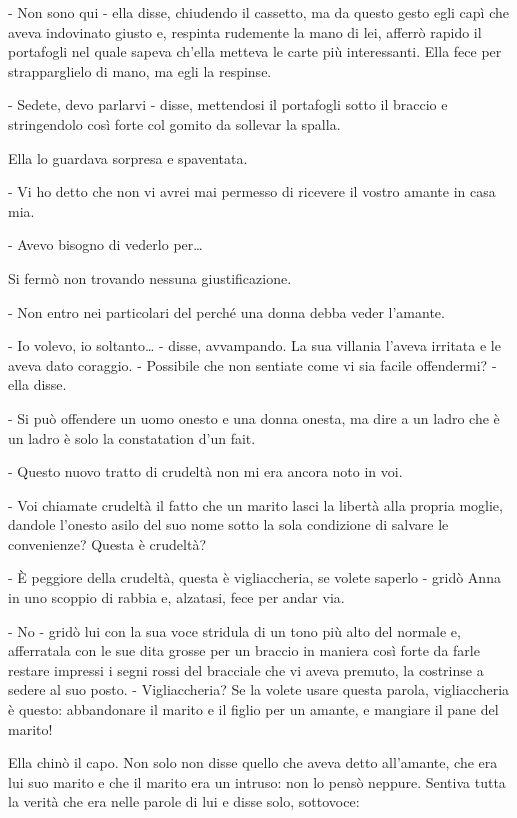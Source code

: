 - Non sono qui - ella disse, chiudendo il cassetto, ma da questo gesto egli capì che aveva indovinato giusto e, respinta rudemente la mano di lei, afferrò rapido il portafogli nel quale sapeva ch'ella metteva le carte più interessanti. Ella fece per strapparglielo di mano, ma egli la respinse. 

- Sedete, devo parlarvi - disse, mettendosi il portafogli sotto il braccio e stringendolo così forte col gomito da sollevar la spalla. 

Ella lo guardava sorpresa e spaventata. 

- Vi ho detto che non vi avrei mai permesso di ricevere il vostro amante in casa mia. 

- Avevo bisogno di vederlo per\ldots{} 

Si fermò non trovando nessuna giustificazione. 

- Non entro nei particolari del perché una donna debba veder l'amante. 

- Io volevo, io soltanto\ldots{} - disse, avvampando. La sua villania l'aveva irritata e le aveva dato coraggio. - Possibile che non sentiate come vi sia facile offendermi? - ella disse. 

- Si può offendere un uomo onesto e una donna onesta, ma dire a un ladro che è un ladro è solo la constatation d'un fait. 

- Questo nuovo tratto di crudeltà non mi era ancora noto in voi. 

- Voi chiamate crudeltà il fatto che un marito lasci la libertà alla propria moglie, dandole l'onesto asilo del suo nome sotto la sola condizione di salvare le convenienze? Questa è crudeltà? 

- È peggiore della crudeltà, questa è vigliaccheria, se volete saperlo - gridò Anna in uno scoppio di rabbia e, alzatasi, fece per andar via. 

- No - gridò lui con la sua voce stridula di un tono più alto del normale e, afferratala con le sue dita grosse per un braccio in maniera così forte da farle restare impressi i segni rossi del bracciale che vi aveva premuto, la costrinse a sedere al suo posto. - Vigliaccheria? Se la volete usare questa parola, vigliaccheria è questo: abbandonare il marito e il figlio per un amante, e mangiare il pane del marito! 

Ella chinò il capo. Non solo non disse quello che aveva detto all'amante, che era lui suo marito e che il marito era un intruso: non lo pensò neppure. Sentiva tutta la verità che era nelle parole di lui e disse solo, sottovoce: 

